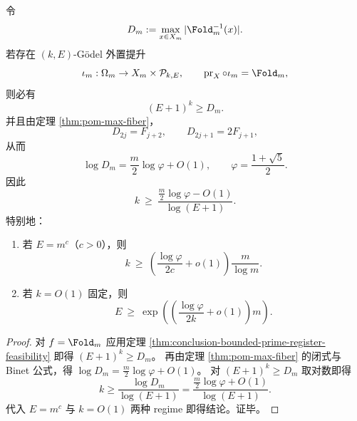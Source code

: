 \begin{theorem}\label{thm:conclusion-fold-prime-axis-exponent-lower-bound}
令
\[
D_m:=\max_{x\in X_m}|\Fold_m^{-1}(x)|.
\]
若存在 \((k,E)\)-Gödel 外置提升
\[
\iota_m:\Omega_m\to X_m\times\mathcal P_{k,E},
\qquad
\operatorname{pr}_X\circ\iota_m=\Fold_m,
\]
则必有
\[
(E+1)^k\ge D_m.
\]
并且由定理 \ref{thm:pom-max-fiber}，
\[
D_{2j}=F_{j+2},\qquad D_{2j+1}=2F_{j+1},
\]
从而
\[
\log D_m=\frac{m}{2}\log\varphi+O(1),\qquad \varphi=\frac{1+\sqrt5}{2}.
\]
因此
\[
k\ \ge\ \frac{\frac{m}{2}\log\varphi-O(1)}{\log(E+1)}.
\]
特别地：
\begin{enumerate}
  \item 若 \(E=m^c\)（\(c>0\)），则
  \[
  k\ \ge\ \left(\frac{\log\varphi}{2c}+o(1)\right)\frac{m}{\log m}.
  \]
  \item 若 \(k=O(1)\) 固定，则
  \[
  E\ \ge\ \exp\!\left(\left(\frac{\log\varphi}{2k}+o(1)\right)m\right).
  \]
\end{enumerate}
\end{theorem}
\begin{proof}
对 \(f=\Fold_m\) 应用定理 \ref{thm:conclusion-bounded-prime-register-feasibility} 即得 \((E+1)^k\ge D_m\)。
再由定理 \ref{thm:pom-max-fiber} 的闭式与 Binet 公式，得 \(\log D_m=\frac{m}{2}\log\varphi+O(1)\)。
对 \((E+1)^k\ge D_m\) 取对数即得
\[
k\ge \frac{\log D_m}{\log(E+1)}
=\frac{\frac{m}{2}\log\varphi+O(1)}{\log(E+1)}.
\]
代入 \(E=m^c\) 与 \(k=O(1)\) 两种 regime 即得结论。证毕。
\end{proof}

